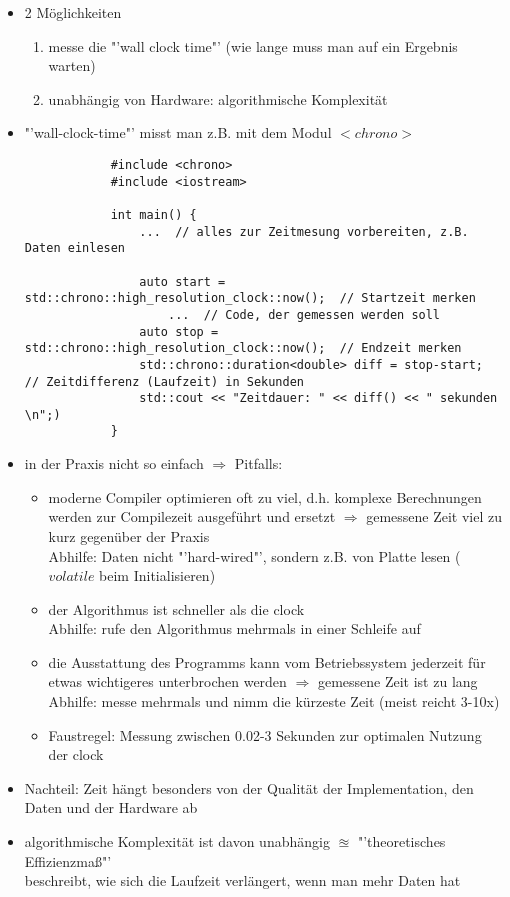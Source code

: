 \documentclass{article}
\begin{document}
	\begin{itemize}
		\item 2 Möglichkeiten
		\begin{enumerate}
			\item messe die "'wall clock time"' (wie lange muss man auf ein Ergebnis warten)
			\item unabhängig von Hardware: algorithmische Komplexität
		\end{enumerate}
		\item "'wall-clock-time"' misst man z.B. mit dem Modul $<chrono>$
		\begin{lstlisting}
			#include <chrono>
			#include <iostream>
			
			int main() {
				...  // alles zur Zeitmesung vorbereiten, z.B. Daten einlesen
				
				auto start = std::chrono::high_resolution_clock::now();  // Startzeit merken
					...  // Code, der gemessen werden soll
				auto stop = std::chrono::high_resolution_clock::now();  // Endzeit merken
				std::chrono::duration<double> diff = stop-start;  // Zeitdifferenz (Laufzeit) in Sekunden
				std::cout << "Zeitdauer: " << diff() << " sekunden \n";)
			}
		\end{lstlisting}
		\item in der Praxis nicht so einfach $\Rightarrow$ Pitfalls:
		\begin{itemize}
			\item moderne Compiler optimieren oft zu viel, d.h. komplexe Berechnungen werden zur Compilezeit ausgeführt und ersetzt $\Rightarrow$ gemessene Zeit viel zu kurz gegenüber der Praxis \\
			Abhilfe: Daten nicht "'hard-wired"', sondern z.B. von Platte lesen ($volatile$ beim Initialisieren)
			\item der Algorithmus ist schneller als die clock  \\
			Abhilfe: rufe den Algorithmus mehrmals in einer Schleife auf
		\item die Ausstattung des Programms kann vom Betriebssystem jederzeit für etwas wichtigeres unterbrochen werden $\Rightarrow$ gemessene Zeit ist zu lang \\
		Abhilfe: messe mehrmals und nimm die kürzeste Zeit (meist reicht 3-10x)
		\item Faustregel: Messung zwischen 0.02-3 Sekunden zur optimalen Nutzung der clock
		\end{itemize}
		\item Nachteil: Zeit hängt besonders von der Qualität der Implementation, den Daten und der Hardware ab
		\item algorithmische Komplexität ist davon unabhängig $\approxeq$ "'theoretisches Effizienzmaß"' \\
		beschreibt, wie sich die Laufzeit verlängert, wenn man mehr Daten hat \\
		

\end{itemize}
\end{document}
